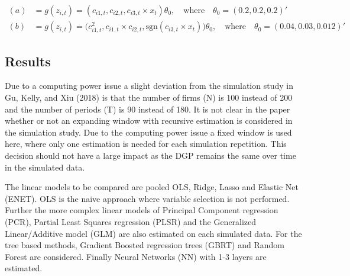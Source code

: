 \documentclass[11pt]{article}
\newcommand{\sgn}{\mathrm{sgn}}
\begin{document}
\[
\begin{aligned}
(a) & = g(z_{i,t}) =  (c_{i1,t}, c_{i2,t}, c_{i3,t} \times x_t)\theta_0, \quad \mathrm{where} \quad \theta_0 = (0.2, 0.2, 0.2)'   \\
(b) & = g(z_{i,t}) = \big(c_{i1,t}^2, c_{i1,t} \times c_{i2,t}, \sgn(c_{i3,t} \times x_t) \big)\theta_0, \quad \mathrm{where} \quad \theta_0 = (0.04, 0.03, 0.012)' 
\end{aligned}
\]

\hypertarget{results}{%
\subsection{Results}\label{results}}

Due to a computing power issue a slight deviation from the simulation
study in Gu, Kelly, and Xiu (2018) is that the number of firms (N) is
100 instead of 200 and the number of periods (T) is 90 instead of 180.
It is not clear in the paper whether or not an expanding window with
recursive estimation is considered in the simulation study. Due to the
computing power issue a fixed window is used here, where only one
estimation is needed for each simulation repetition. This decision
should not have a large impact as the DGP remains the same over time
in the simulated data.

The linear models to be compared are pooled OLS, Ridge, Lasso and
Elastic Net (ENET). OLS is the naive approach where variable selection
is not performed. Further the more complex linear models of Principal
Component regression (PCR), Partial Least Squares regression (PLSR) and
the Generalized Linear/Additive model (GLM) are also estimated on each
simulated data. For the tree based methods, Gradient Boosted regression
trees (GBRT) and Random Forest are considered. Finally Neural Networks
(NN) with 1-3 layers are estimated.
\end{document}
